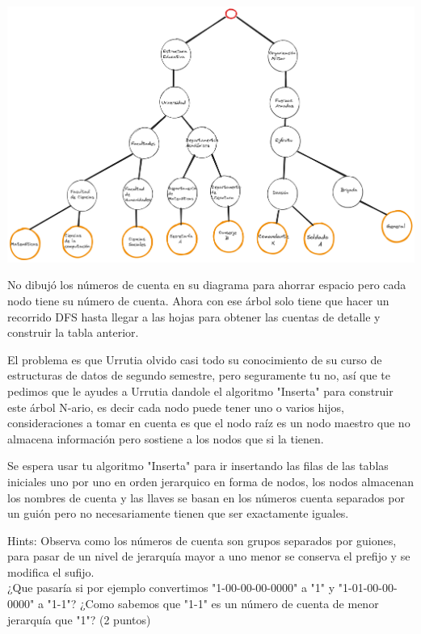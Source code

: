 \begin{center}
    \includegraphics[scale=0.1]{../Image/Arbol.png}
\end{center}

No dibujó los números de cuenta en su diagrama para ahorrar espacio pero cada nodo tiene su número de cuenta. Ahora con ese árbol solo tiene que hacer un recorrido DFS hasta llegar a las hojas para obtener las cuentas de detalle y construir la tabla anterior.

El problema es que Urrutia olvido casi todo su conocimiento de su curso de estructuras de datos de segundo semestre, pero seguramente tu no, así que te pedimos que le ayudes a Urrutia dandole el algoritmo "Inserta" para construir este árbol N-ario, es decir cada nodo puede tener uno o varios hijos, consideraciones a tomar en cuenta es que el nodo raíz es un nodo maestro que no almacena información pero sostiene a los nodos que si la tienen.

Se espera usar tu algoritmo "Inserta" para ir insertando las filas de las tablas iniciales uno por uno en orden jerarquico en forma de nodos, los nodos almacenan los nombres de cuenta y las llaves se basan en los números cuenta separados por un guión pero no necesariamente tienen que ser exactamente iguales.

Hints: Observa como los números de cuenta son grupos separados por guiones, para pasar de un nivel de jerarquía mayor a uno menor se conserva el prefijo y se modifica el sufijo. \\ ¿Que pasaría si por ejemplo convertimos "1-00-00-00-0000" a "1" y "1-01-00-00-0000" a "1-1"? ¿Como sabemos que "1-1" es un número de cuenta de menor jerarquía que "1"? (2 puntos)\newline



